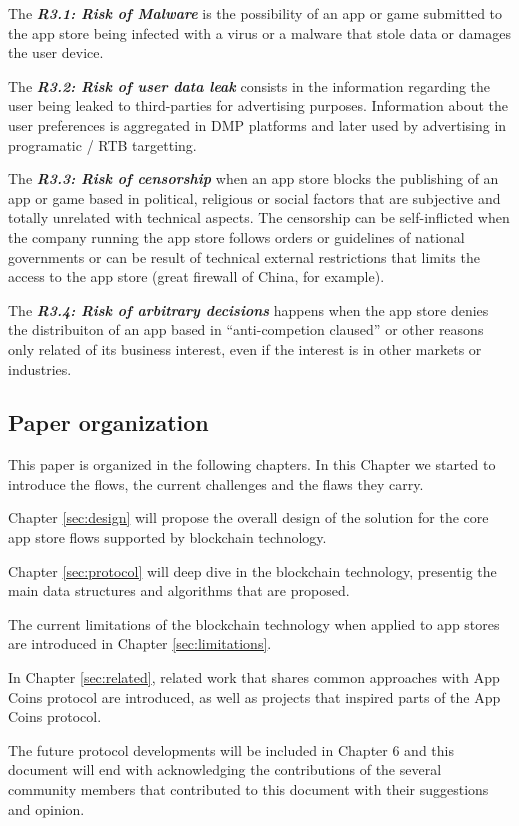 \begin{tcolorbox}[enhanced jigsaw,sharp corners, drop fuzzy shadow=ShadowColor]

The {\bf\em R3.1: Risk of Malware} is the possibility of an app or game submitted to the app store being infected with a virus or a malware that stole data or damages the user device.

The {\bf\em R3.2: Risk of user data leak} consists in the information regarding the user being leaked to third-parties for advertising purposes. Information about the user preferences is aggregated in DMP platforms and later used by advertising in programatic / RTB targetting.

The {\bf\em R3.3: Risk of censorship} when an app store blocks the publishing of an app or game based in political, religious or social factors that are subjective and totally unrelated with technical aspects. The censorship can be self-inflicted when the company running the app store follows orders or guidelines of national governments or can be result of technical external restrictions that limits the access to the app store (great firewall of China, for example).

The {\bf\em R3.4: Risk of arbitrary decisions} happens when the app store denies the distribuiton of an app based in ``anti-competion claused''\cite{PlayTermsService} or other reasons only related of its business interest, even if the interest is in other markets or industries.

\end{tcolorbox}

\subsection{Paper organization}

This paper is organized in the following chapters. In this Chapter we started to introduce the flows, the current challenges and the flaws they carry.

Chapter \ref{sec:design} will propose the overall design of the solution for the core app store flows supported by blockchain technology. 

Chapter \ref{sec:protocol} will deep dive in the blockchain technology, presentig the main data structures and algorithms that are proposed.

The current limitations of the blockchain technology when applied to app stores are introduced in Chapter \ref{sec:limitations}.

In Chapter \ref{sec:related}, related work that shares common approaches with App Coins protocol are introduced, as well as projects that inspired parts of the App Coins protocol.


The future protocol developments will be included in Chapter 6 and this document will end with acknowledging the contributions of the several community members that contributed to this document with their suggestions and opinion.


